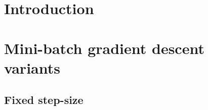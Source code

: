 \section{Introduction}\label{sc:intro}



\section{Mini-batch gradient descent variants}

\subsection{Fixed step-size}

\begin{lstlisting}[style=simple,title={}]

\end{lstlisting}




